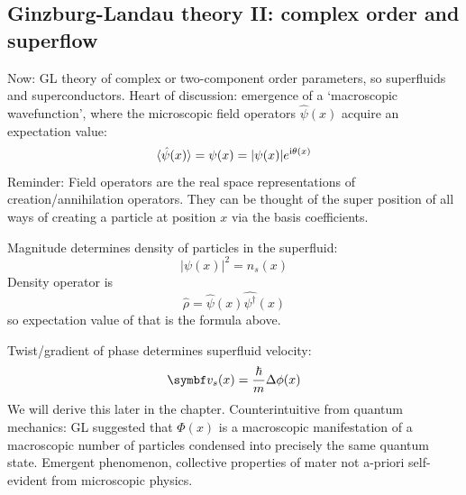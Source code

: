 \documentclass[../main.tex]{subfiles}
\begin{document}

\subsection{Ginzburg-Landau theory II: complex order and superflow}

Now: GL theory of complex or two-component order parameters, so superfluids and superconductors.
Heart of discussion: emergence of a `macroscopic wavefunction', where the microscopic field operators \(\hat{\psi}(x)\) acquire an expectation value:
\begin{equation}
	\braket{\hat{\psi} (x)} = \psi (x) = \vert \psi (x) \vert e^{\mathrm{i} \theta(x)}
\end{equation}
Reminder: Field operators are the real space representations of creation/annihilation operators.
They can be thought of the super position of all ways of creating a particle at position \(x\) via the basis coefficients.

Magnitude determines density of particles in the superfluid:
\begin{equation}
	\vert \psi(x) \vert^2 = n_s (x)
\end{equation}
Density operator is
\begin{equation}
	\hat{\rho} = \hat{\psi} (x) \hat{\psi^{\dagger}} (x)
\end{equation}
so expectation value of that is the formula above.

Twist/gradient of phase determines superfluid velocity:
\begin{equation}
	\vb{v}_s (x) = \frac{\hbar}{m} \Delta \phi (x)
\end{equation}
We will derive this later in the chapter.
Counterintuitive from quantum mechanics: GL suggested that \(\Phi(x)\) is a macroscopic manifestation of a macroscopic number of particles condensed into precisely the same quantum state.
Emergent phenomenon, collective properties of mater not a-priori self-evident from microscopic physics.
\end{document}
